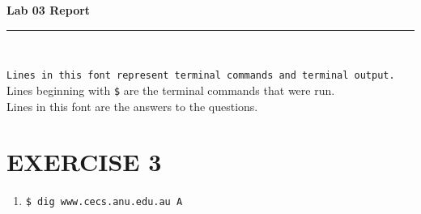 \documentclass[a4paper,11pt]{article}
\newcommand{\code}{\texttt}
\newcommand{\HRule}{\rule{\linewidth}{0.5mm}} %
\begin{document}
\begin{center}
	\LARGE \textbf{Lab 03 Report}
	\HRule\\
\end{center}


\noindent \code{Lines in this font represent terminal commands and terminal output.}\\
Lines beginning with \code{\$} are the terminal commands that were run.\\
Lines in this font are the answers to the questions.

\section{EXERCISE 3}
\begin{enumerate}[leftmargin=*]
	\item \code{\$ dig www.cecs.anu.edu.au A}


\end{enumerate}
\end{document}
